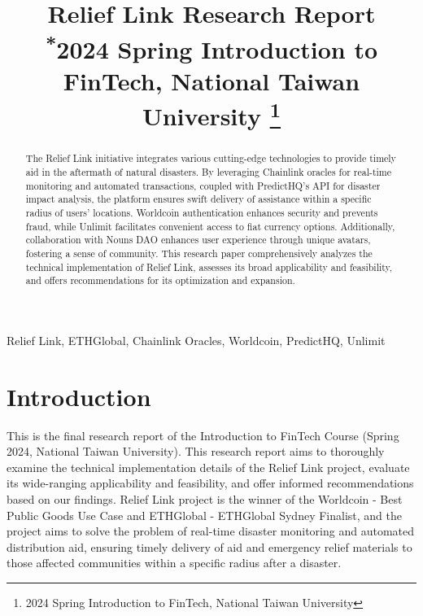 \documentclass[conference]{IEEEtran}
\begin{document}
\title{Relief Link Research Report\\
{\footnotesize \textsuperscript{*}2024 Spring Introduction to FinTech, National Taiwan University}
\thanks{2024 Spring Introduction to FinTech, National Taiwan University}
}

\author{
}

\maketitle
\thispagestyle{plain}
\pagestyle{plain}

\begin{abstract}
    The Relief Link initiative integrates various cutting-edge technologies to provide timely aid in the aftermath of natural disasters. By leveraging Chainlink oracles for real-time monitoring and automated transactions, coupled with PredictHQ's API for disaster impact analysis, the platform ensures swift delivery of assistance within a specific radius of users' locations. Worldcoin authentication enhances security and prevents fraud, while Unlimit facilitates convenient access to fiat currency options. Additionally, collaboration with Nouns DAO enhances user experience through unique avatars, fostering a sense of community. This research paper comprehensively analyzes the technical implementation of Relief Link, assesses its broad applicability and feasibility, and offers recommendations for its optimization and expansion.
\end{abstract}

\begin{IEEEkeywords}
    Relief Link, ETHGlobal, Chainlink Oracles, Worldcoin, PredictHQ, Unlimit
\end{IEEEkeywords}

\section{Introduction}
This is the final research report of the Introduction to FinTech Course (Spring 2024, National Taiwan University). This research report aims to thoroughly examine the technical implementation details of the Relief Link project, evaluate its wide-ranging applicability and feasibility, and offer informed recommendations based on our findings. Relief Link project is the winner of the Worldcoin - Best Public Goods Use Case and ETHGlobal - ETHGlobal Sydney Finalist, and the project aims to solve the problem of real-time disaster monitoring and automated distribution aid, ensuring timely delivery of aid and emergency relief materials to those affected communities within a specific radius after a disaster.
\end{document}
